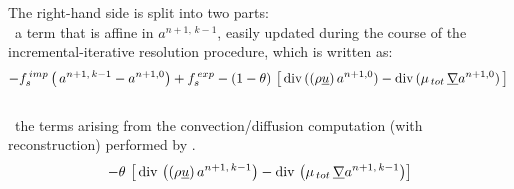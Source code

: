 The right-hand side is split into two parts:\\
\hspace*{1cm}{\tiny$\blacksquare$}\ a term that is affine in $a^{n+1,\,k-1}$, easily updated during the course of the incremental-iterative resolution procedure, which is written as:
\begin{equation}\notag
 -f_s^{\,imp} \left(\,a^{n+1,\,k-1} - a^{n+1,0}\right) + f_s^{\,exp}- (1-\theta)\,\left[\,\text{div}\,((\rho \underline{u})\,a^{n+1,0}) - \text{div}\,(\mu_{\,tot}\,\underline{\nabla} a^{n+1,0})\,\right]\\
\end{equation}
\\
\hspace*{1cm}{\tiny$\blacksquare$}\ the terms arising from the
convection/diffusion computation (with reconstruction) performed by .\\
\begin{equation}\notag
- \theta\,\left[\,\text{div}\,\left((\rho \underline{u})\,a^{n+1,\,k-1}\right)- \text{div}\,\left(\mu_{\,tot}\,\underline{\nabla} a^{n+1,\,k-1}\right)\right]
\end{equation}

